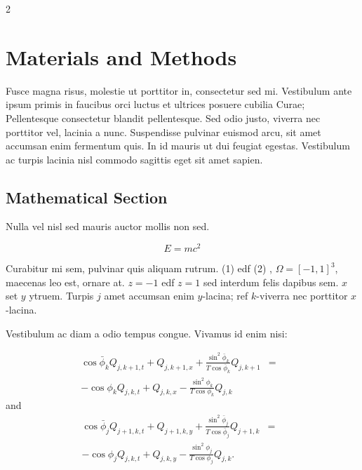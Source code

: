 \documentclass{article}
\begin{document}
\begin{multicols}{2}


\section*{Materials and Methods}

Fusce magna risus, molestie ut porttitor in, consectetur sed mi. Vestibulum ante ipsum primis in faucibus orci luctus et ultrices posuere cubilia Curae; Pellentesque consectetur blandit pellentesque. Sed odio justo, viverra nec porttitor vel, lacinia a nunc. Suspendisse pulvinar euismod arcu, sit amet accumsan enim fermentum quis. In id mauris ut dui feugiat egestas. Vestibulum ac turpis lacinia nisl commodo sagittis eget sit amet sapien.


\subsection*{Mathematical Section}

Nulla vel nisl sed mauris auctor mollis non sed. 

\begin{equation}
E = mc^{2}
\label{eqn:Einstein}
\end{equation}

Curabitur mi sem, pulvinar quis aliquam rutrum. (1) edf (2)
, $\Omega=[-1,1]^3$, maecenas leo est, ornare at. $z=-1$ edf $z=1$ sed interdum felis dapibus sem. $x$ set $y$ ytruem. 
Turpis $j$ amet accumsan enim $y$-lacina; 
ref $k$-viverra nec porttitor $x$-lacina. 

Vestibulum ac diam a odio tempus congue. Vivamus id enim nisi:

\begin{eqnarray}
\cos\bar{\phi}_k Q_{j,k+1,t} + Q_{j,k+1,x}+\frac{\sin^2\bar{\phi}_k}{T\cos\bar{\phi}_k} Q_{j,k+1} &=&\nonumber\\ 
-\cos\phi_k Q_{j,k,t} + Q_{j,k,x}-\frac{\sin^2\phi_k}{T\cos\phi_k} Q_{j,k}\label{edgek}
\end{eqnarray}
and
\begin{eqnarray}
\cos\bar{\phi}_j Q_{j+1,k,t} + Q_{j+1,k,y}+\frac{\sin^2\bar{\phi}_j}{T\cos\bar{\phi}_j} Q_{j+1,k}&=&\nonumber \\
-\cos\phi_j Q_{j,k,t} + Q_{j,k,y}-\frac{\sin^2\phi_j}{T\cos\phi_j} Q_{j,k}.\label{edgej}
\end{eqnarray} 


\end{multicols}
\end{document}
